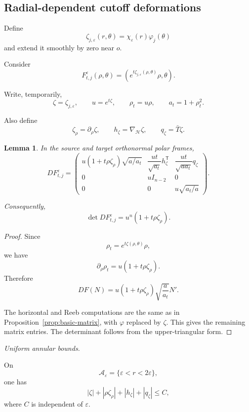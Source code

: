 \documentclass[11pt,reqno]{amsart}
\numberwithin{equation}{section}
\newtheorem{lemma}[theorem]{Lemma}
\theoremstyle{definition}
\theoremstyle{remark}
\newcommand{\eps}{\varepsilon}
\newcommand{\ithead}[1]{%
  \par\medskip\noindent\textit{#1}\enspace
}
\begin{document}
\subsection{Radial-dependent cutoff deformations}

Define
\[
\zeta_{j,\eps}(r,\theta)
=
\chi_\eps(r)\varphi_j(\theta)
\]
and extend it smoothly by zero near \(o\).

Consider
\[
F^\eps_{t,j}(\rho,\theta)
=
\left(
e^{t\zeta_{j,\eps}(\rho,\theta)}\rho,
\theta
\right).
\]

Write, temporarily,
\[
\zeta=\zeta_{j,\eps},
\qquad
u=e^{t\zeta},
\qquad
\rho_t=u\rho,
\qquad
a_t=1+\rho_t^2.
\]

Also define
\[
\zeta_\rho=\partial_\rho\zeta,
\qquad
h_\zeta=\nabla_{\mathcal H}\zeta,
\qquad
q_\zeta=\bar T\zeta.
\]

\begin{lemma}
\label{lem:cutoff-matrix}
In the source and target orthonormal polar frames,
\begin{equation}
DF^\eps_{t,j}
=
\begin{pmatrix}
u(1+t\rho\zeta_\rho)\sqrt{a/a_t}
&
\dfrac{ut}{\sqrt{a_t}}h_\zeta^{\mathsf T}
&
\dfrac{ut}{\sqrt{aa_t}}q_\zeta
\\[0.8em]
0&uI_{n-2}&0
\\
0&0&u\sqrt{a_t/a}
\end{pmatrix}.
\label{eq:cutoff-matrix}
\end{equation}

Consequently,
\[
\det DF^\eps_{t,j}
=
u^n(1+t\rho\zeta_\rho).
\]
\end{lemma}

\begin{proof}
Since
\[
\rho_t=e^{t\zeta(\rho,\theta)}\rho,
\]
we have
\[
\partial_\rho\rho_t
=
u(1+t\rho\zeta_\rho).
\]
Therefore
\[
DF(N)
=
u(1+t\rho\zeta_\rho)
\sqrt{\frac{a}{a_t}}N'.
\]

The horizontal and Reeb computations are the same as in
Proposition~\ref{prop:basic-matrix}, with \(\varphi\) replaced by \(\zeta\).
This gives the remaining matrix entries. The determinant follows from the
upper-triangular form.
\end{proof}

\ithead{Uniform annular bounds.}

On
\[
\mathcal A_\eps
=
\{\eps<r<2\eps\},
\]
one has
\begin{equation}
|\zeta|
+
|\rho\zeta_\rho|
+
|h_\zeta|
+
|q_\zeta|
\le C,
\label{eq:uniform-zeta}
\end{equation}
where \(C\) is independent of \(\eps\).
\end{document}
